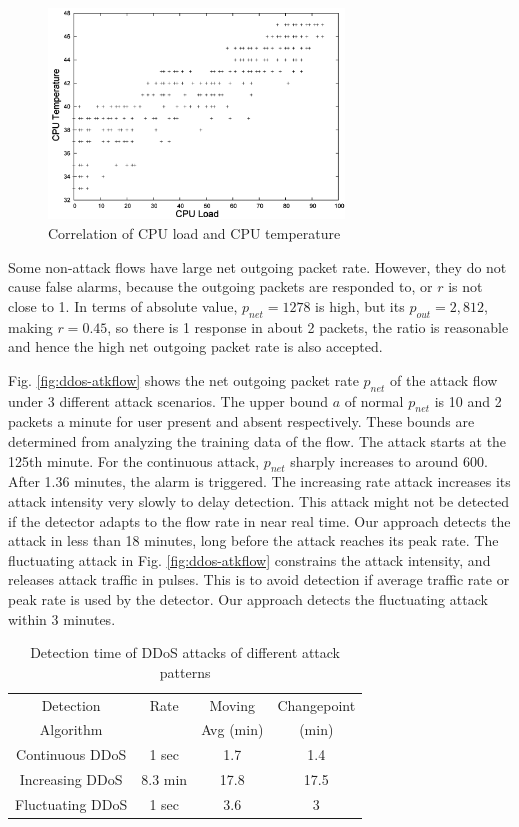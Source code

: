 \begin{figure}[htb]
\centering
\includegraphics[width=0.7\textwidth]{sensor/load-temp.png}
\caption{Correlation of CPU load and CPU temperature}
\label{fig:temp-cpuload}
\end{figure}

Some non-attack flows have large net outgoing packet rate. However,
they do not cause false alarms, because the outgoing packets are
responded to, or $r$ is not close to 1. In terms of absolute value,
$p_{net}=1278$ is high, but its $p_{out}=2,812$, making $r=0.45$, so
there is 1 response in about 2 packets, the ratio is reasonable and
hence the high net outgoing packet rate is also accepted.

Fig. \ref{fig:ddos-atkflow} shows the net outgoing packet rate
$p_{net}$ of the attack flow under 3 different attack scenarios. The
upper bound $a$ of normal $p_{net}$ is 10 and 2 packets a minute for
user present and absent respectively. These bounds are determined
from analyzing the training data of the flow. The attack starts at
the 125th minute. For the continuous attack, $p_{net}$ sharply
increases to around 600. After 1.36 minutes, the alarm is triggered.
The increasing rate attack increases its attack intensity very
slowly to delay detection. This attack might not be detected if the
detector adapts to the flow rate in near real time. Our approach
detects the attack in less than 18 minutes, long before the attack
reaches its peak rate. The fluctuating attack in Fig. \ref{fig:ddos-atkflow}
constrains the attack intensity, and releases attack traffic in
pulses. This is to avoid detection if average traffic rate or peak
rate is used by the detector. Our approach detects the fluctuating
attack within 3 minutes.

\begin{table}[!t]
  \centering
  \begin{tabular}{|c|c|c|c|}
  \hline
  Detection & Rate & Moving & Changepoint \\
  Algorithm & & Avg (min) & (min) \\
  \hline
  Continuous DDoS  & 1 sec & 1.7  & 1.4   \\
  \hline
  Increasing DDoS & 8.3 min & 17.8  & 17.5   \\
  \hline
  Fluctuating DDoS & 1 sec &  3.6  & 3   \\ [0.5ex]
  \hline
  \end{tabular}
  \caption{Detection time of DDoS attacks of different attack patterns}
  \label{tbl:detect-DDoS}
\end{table}

